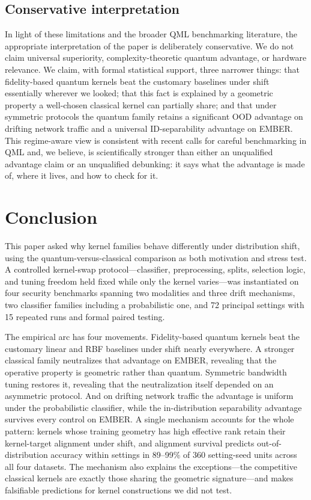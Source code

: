 \documentclass[journal]{IEEEtran}
\begin{document}
\subsection{Conservative interpretation}

In light of these limitations and the broader QML benchmarking literature, the appropriate interpretation of the paper is deliberately conservative. We do not claim universal superiority, complexity-theoretic quantum advantage, or hardware relevance. We claim, with formal statistical support, three narrower things: that fidelity-based quantum kernels beat the customary baselines under shift essentially wherever we looked; that this fact is explained by a geometric property a well-chosen classical kernel can partially share; and that under symmetric protocols the quantum family retains a significant OOD advantage on drifting network traffic and a universal ID-separability advantage on EMBER. This regime-aware view is consistent with recent calls for careful benchmarking in QML \cite{bowles2024betterthanclassical,schnabel2025scrutiny} and, we believe, is scientifically stronger than either an unqualified advantage claim or an unqualified debunking: it says what the advantage is made of, where it lives, and how to check for it.


\section{Conclusion}
\label{sec:conclusion}

This paper asked why kernel families behave differently under distribution shift, using the quantum-versus-classical comparison as both motivation and stress test. A controlled kernel-swap protocol---classifier, preprocessing, splits, selection logic, and tuning freedom held fixed while only the kernel varies---was instantiated on four security benchmarks spanning two modalities and three drift mechanisms, two classifier families including a probabilistic one, and 72 principal settings with 15 repeated runs and formal paired testing.

The empirical arc has four movements. Fidelity-based quantum kernels beat the customary linear and RBF baselines under shift nearly everywhere. A stronger classical family neutralizes that advantage on EMBER, revealing that the operative property is geometric rather than quantum. Symmetric bandwidth tuning restores it, revealing that the neutralization itself depended on an asymmetric protocol. And on drifting network traffic the advantage is uniform under the probabilistic classifier, while the in-distribution separability advantage survives every control on EMBER. A single mechanism accounts for the whole pattern: kernels whose training geometry has high effective rank retain their kernel-target alignment under shift, and alignment survival predicts out-of-distribution accuracy within settings in 89--99\% of 360 setting-seed units across all four datasets. The mechanism also explains the exceptions---the competitive classical kernels are exactly those sharing the geometric signature---and makes falsifiable predictions for kernel constructions we did not test.
\end{document}
